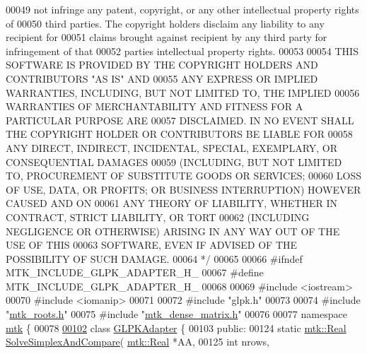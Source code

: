 \begin{DoxyCode}
00049 \textcolor{comment}{not infringe any patent, copyright, or any other intellectual property rights of}
00050 \textcolor{comment}{third parties. The copyright holders disclaim any liability to any recipient for}
00051 \textcolor{comment}{claims brought against recipient by any third party for infringement of that}
00052 \textcolor{comment}{parties intellectual property rights.}
00053 \textcolor{comment}{}
00054 \textcolor{comment}{THIS SOFTWARE IS PROVIDED BY THE COPYRIGHT HOLDERS AND CONTRIBUTORS "AS IS" AND}
00055 \textcolor{comment}{ANY EXPRESS OR IMPLIED WARRANTIES, INCLUDING, BUT NOT LIMITED TO, THE IMPLIED}
00056 \textcolor{comment}{WARRANTIES OF MERCHANTABILITY AND FITNESS FOR A PARTICULAR PURPOSE ARE}
00057 \textcolor{comment}{DISCLAIMED. IN NO EVENT SHALL THE COPYRIGHT HOLDER OR CONTRIBUTORS BE LIABLE FOR}
00058 \textcolor{comment}{ANY DIRECT, INDIRECT, INCIDENTAL, SPECIAL, EXEMPLARY, OR CONSEQUENTIAL DAMAGES}
00059 \textcolor{comment}{(INCLUDING, BUT NOT LIMITED TO, PROCUREMENT OF SUBSTITUTE GOODS OR SERVICES;}
00060 \textcolor{comment}{LOSS OF USE, DATA, OR PROFITS; OR BUSINESS INTERRUPTION) HOWEVER CAUSED AND ON}
00061 \textcolor{comment}{ANY THEORY OF LIABILITY, WHETHER IN CONTRACT, STRICT LIABILITY, OR TORT}
00062 \textcolor{comment}{(INCLUDING NEGLIGENCE OR OTHERWISE) ARISING IN ANY WAY OUT OF THE USE OF THIS}
00063 \textcolor{comment}{SOFTWARE, EVEN IF ADVISED OF THE POSSIBILITY OF SUCH DAMAGE.}
00064 \textcolor{comment}{*/}
00065 
00066 \textcolor{preprocessor}{#ifndef MTK\_INCLUDE\_GLPK\_ADAPTER\_H\_}
00067 \textcolor{preprocessor}{#define MTK\_INCLUDE\_GLPK\_ADAPTER\_H\_}
00068 
00069 \textcolor{preprocessor}{#include <iostream>}
00070 \textcolor{preprocessor}{#include <iomanip>}
00071 
00072 \textcolor{preprocessor}{#include "glpk.h"}
00073 
00074 \textcolor{preprocessor}{#include "\hyperlink{mtk__roots_8h}{mtk\_roots.h}"}
00075 \textcolor{preprocessor}{#include "\hyperlink{mtk__dense__matrix_8h}{mtk\_dense\_matrix.h}"}
00076 
00077 \textcolor{keyword}{namespace }\hyperlink{namespacemtk}{mtk} \{
00078 
\hypertarget{mtk__glpk__adapter_8h_source_l00102}{}\hyperlink{classmtk_1_1GLPKAdapter}{00102} \textcolor{keyword}{class }\hyperlink{classmtk_1_1GLPKAdapter}{GLPKAdapter} \{
00103  \textcolor{keyword}{public}:
00124   \textcolor{keyword}{static} \hyperlink{group__c01-roots_gac080bbbf5cbb5502c9f00405f894857d}{mtk::Real} \hyperlink{classmtk_1_1GLPKAdapter_a0c9ebb125445bc5af752bf4fb47f44b2}{SolveSimplexAndCompare}(
      \hyperlink{group__c01-roots_gac080bbbf5cbb5502c9f00405f894857d}{mtk::Real} *AA,
00125                                           \textcolor{keywordtype}{int} nrows,

\end{DoxyCode}
